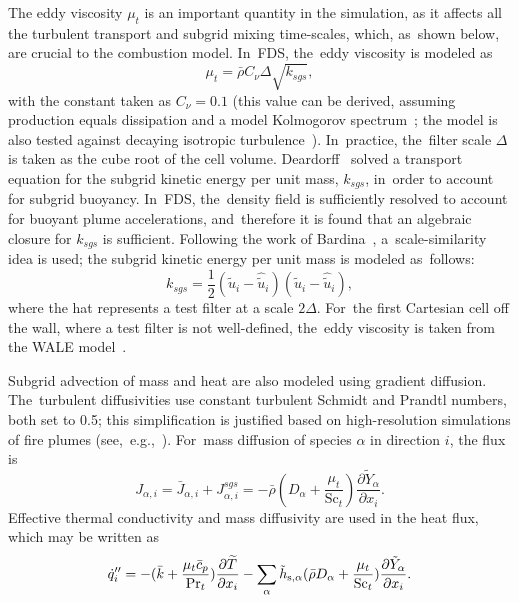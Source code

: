 \documentclass[atmosphere,article,accept,moreauthors,pdftex]{Definitions/mdpi}
\begin{document}
The eddy viscosity $\mu_t$ is an important quantity in the simulation, as it affects all the turbulent transport and subgrid mixing time-scales, which, as~shown below, are crucial to the combustion model.  In~FDS, the~eddy viscosity is modeled as~\cite{Pope:2000,Deardorff:1980}
\begin{equation}
\mu_t = \bar{\rho} C_\nu \Delta \sqrt{k_{sgs}},
\end{equation}
with the constant taken as $C_\nu = 0.1$ (this value can be derived, assuming production equals dissipation and a model Kolmogorov spectrum~\cite{Pope:2000}; the model is also tested against decaying isotropic turbulence~\cite{CBC}).  In~practice, the~filter scale $\Delta$ is taken as the cube root of the cell volume.  Deardorff~\cite{Deardorff:1980} solved a transport equation for the subgrid kinetic energy per unit mass, $k_{sgs}$, in~order to account for subgrid buoyancy. In~FDS, the~density field is sufficiently resolved to account for buoyant plume accelerations, and~therefore it is found that an algebraic closure for $k_{sgs}$ is sufficient.  Following the work of Bardina~\cite{Bardina:1980}, a~scale-similarity idea is used; the subgrid kinetic energy per unit mass is modeled \mbox{as follows}:
\begin{equation}
k_{sgs} = \frac{1}{2}(\tilde{u}_i - \hat{\tilde{u}}_i)(\tilde{u}_i - \hat{\tilde{u}}_i),
\end{equation}
where the hat represents a test filter at a scale $2\Delta$.  For~the first Cartesian cell off the wall, where a test filter is not well-defined, the~eddy viscosity is taken from the WALE model~\cite{Nicoud:1999}.

Subgrid advection of mass and heat are also modeled using gradient diffusion.  The~turbulent diffusivities use constant turbulent Schmidt and Prandtl numbers, both set to 0.5; this simplification is justified based on high-resolution simulations of fire plumes (\mbox{see, e.g.,~\cite{Maragkos:2020}}). For~mass diffusion of species $\alpha$ in direction $i$, the flux is
\begin{equation}
J_{\alpha,i} = \bar{J}_{\alpha,i} + J_{\alpha,i}^{sgs} = -\bar{\rho}(D_\alpha + \frac{\mu_t}{\mathrm{Sc}_t}) \frac{\partial \tilde{Y}_\alpha}{\partial x_i}.
\end{equation}
Effective thermal conductivity and mass diffusivity are used in the heat flux, which may be written as
\begin{equation}
{\dot{q}''}_i = -(\bar{k} + \frac{\mu_t \bar{c}_p}{\mathrm{Pr}_t}) \frac{\partial \widetilde{T}}{\partial x_i} - \sum_\alpha \tilde{h}_{{\rm s},\alpha} ( \bar{\rho} D_\alpha + \frac{\mu_t}{\mathrm{Sc}_t} ) \frac{\partial \tilde{Y}_\alpha }{\partial x_i}.
\end{equation}
\end{document}

